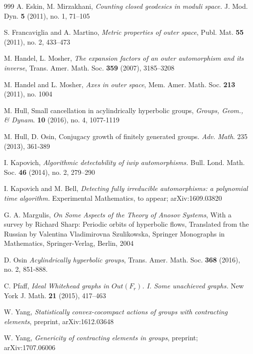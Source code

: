 \documentclass[11pt,letterpaper]{amsart}
\theoremstyle{definition}
\theoremstyle{remark}
\begin{document}
\begin{thebibliography}{999}
A. Eskin, M. Mirzakhani, \emph{Counting closed geodesics in moduli space.} J. Mod. Dyn. \textbf{5} (2011), no. 1, 71--105

S. Francaviglia and A. Martino, \emph{Metric properties of outer space}, Publ. Mat. \textbf{55} (2011), no. 2,  433--473


M. Handel, L. Mosher, \emph{The expansion factors of an outer automorphism and its inverse}, Trans. Amer. Math. Soc. \textbf{359} (2007), 3185--3208

M. Handel and L. Mosher, \emph{Axes in outer space}, Mem. Amer. Math. Soc. \textbf{213} (2011), no. 1004

M. Hull, Small cancellation in acylindrically hyperbolic groups, \emph{Groups, Geom., \& Dynam}. {\bf 10} (2016), no. 4, 1077-1119

 M. Hull, D. Osin, Conjugacy growth of finitely generated groups. \emph{Adv. Math}. 235 (2013), 361-389

I. Kapovich, \emph{Algorithmic detectability of iwip automorphisms.} Bull. Lond. Math. Soc. \textbf{46} (2014), no. 2, 279--290 

I. Kapovich and M. Bell, \emph{Detecting fully irreducible automorphisms: a polynomial time algorithm.} Experimental Mathematics, to appear; arXiv:1609.03820

G. A. Margulis, \emph{On Some Aspects of the Theory of Anosov Systems}, With a survey by Richard Sharp: Periodic orbits of hyperbolic flows, Translated from the Russian by Valentina Vladimirovna Szulikowska, Springer Monographs in Mathematics, Springer-Verlag, Berlin, 2004

D. Osin \emph{Acylindrically hyperbolic groups},
Trans. Amer. Math. Soc. \textbf{368} (2016), no. 2, 851-888. 

C. Pfaff, \emph{Ideal Whitehead graphs in $Out(F_r)$. I. Some unachieved graphs.} New York J. Math. \textbf{21} (2015), 417--463

W. Yang,
\emph{Statistically convex-cocompact actions of groups with contracting elements}, preprint, arXiv:1612.03648

W. Yang,
\emph{Genericity of contracting elements in groups}, preprint; arXiv:1707.06006

\end{thebibliography}
\vspace{1cm}
\end{document}
